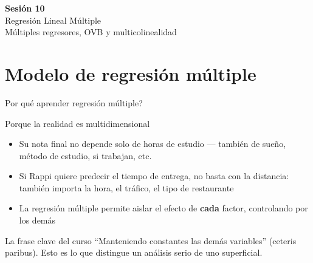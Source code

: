 \documentclass[aspectratio=169, 11pt]{beamer}
\begin{document}
\begin{frame}{}
\vfill
\centering
{\Large\textbf{Sesi\'on 10}}\\[1em]
{\normalsize Regresi\'on Lineal M\'ultiple}\\[0.5em]
{\small M\'ultiples regresores, OVB y multicolinealidad}
\vfill
\end{frame}

\section{Modelo de regresión múltiple}

\begin{frame}{\textquestiondown{}Por qu\'e aprender regresi\'on m\'ultiple?}
\begin{exampleblock}{Porque la realidad es multidimensional}
\small
\begin{itemize}\setlength{\itemsep}{2pt}
  \item Su nota final no depende solo de horas de estudio --- tambi\'en de sue\~no, m\'etodo de estudio, si trabajan, etc.
  \item Si Rappi quiere predecir el tiempo de entrega, no basta con la distancia: tambi\'en importa la hora, el tr\'afico, el tipo de restaurante
  \item La regresi\'on m\'ultiple permite aislar el efecto de \textbf{cada} factor, controlando por los dem\'as
\end{itemize}
\end{exampleblock}

\begin{block}{La frase clave del curso}
\small
``Manteniendo constantes las dem\'as variables'' (ceteris paribus). Esto es lo que distingue un an\'alisis serio de uno superficial.
\end{block}
\end{frame}
\end{document}

